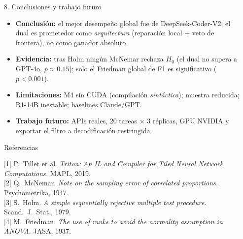 \documentclass[final]{beamer}
\newlength{\sepwidth}
\newlength{\colwidth}
\newcommand{\separatorcolumn}{\begin{column}{\sepwidth}\end{column}}
\begin{document}
\begin{frame}[t]
\begin{columns}[t]
\begin{column}{\colwidth}
\begin{block}{8. Conclusiones y trabajo futuro}
    \begin{itemize}
      \item \textbf{Conclusión:} el mejor desempeño global fue de
        DeepSeek-Coder-V2; el dual es prometedor como \emph{arquitectura}
        (reparación local + veto de frontera), no como ganador absoluto.
      \item \textbf{Evidencia:} tras Holm ningún McNemar rechaza $H_0$ (el dual
        no supera a GPT-4o, $p\approx 0.15$); solo el Friedman global de F1 es
        significativo ($p<0.001$).
      \item \textbf{Limitaciones:} M4 sin CUDA (compilación \emph{sintáctica});
        muestra reducida; R1-14B inestable; baselines Claude/GPT.
      \item \textbf{Trabajo futuro:} APIs reales, 20 tareas $\times$ 3 réplicas,
        GPU NVIDIA y exportar el filtro a decodificación restringida.
    \end{itemize}

  \end{block}

  \begin{block}{Referencias}

    {\scriptsize\raggedright
    [1] P.~Tillet et al. \emph{Triton: An IL and Compiler for Tiled Neural
    Network Computations.} MAPL, 2019.\\[0.2em]
    [2] Q.~McNemar. \emph{Note on the sampling error of correlated proportions.}
    Psychometrika, 1947.\\[0.2em]
    [3] S.~Holm. \emph{A simple sequentially rejective multiple test procedure.}
    Scand.\ J.\ Stat., 1979.\\[0.2em]
    [4] M.~Friedman. \emph{The use of ranks to avoid the normality assumption in
    ANOVA.} JASA, 1937.\par}

  \end{block}

\end{column}

\separatorcolumn
\end{columns}
\end{frame}
\end{document}
